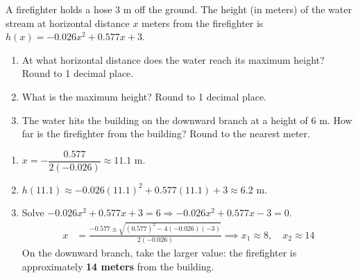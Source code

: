 \documentclass{ximera}
\begin{document}
\begin{problem}
A firefighter holds a hose 3 m off the ground. The height (in meters) of the water stream at horizontal distance $x$ meters from the firefighter is $h(x) = -0.026x^2 + 0.577x + 3$.
\begin{enumerate}
  \item[(a)] At what horizontal distance does the water reach its maximum height? Round to 1 decimal place.
  \medskip
  \item[(b)] What is the maximum height? Round to 1 decimal place.
  \medskip
  \item[(c)] The water hits the building on the downward branch at a height of 6 m. How far is the firefighter from the building? Round to the nearest meter.
\end{enumerate}

\begin{solution}
\begin{enumerate}
  \item[(a)] $x = -\dfrac{0.577}{2(-0.026)} \approx 11.1$ m.

  \item[(b)] $h(11.1) \approx -0.026(11.1)^2+0.577(11.1)+3 \approx 6.2$ m.

  \item[(c)] Solve $-0.026x^2+0.577x+3=6 \Rightarrow -0.026x^2+0.577x-3=0$.
  \begin{align*}
    x &= \frac{-0.577\pm\sqrt{(0.577)^2-4(-0.026)(-3)}}{2(-0.026)} \implies x_1 \approx 8,\quad x_2 \approx 14
  \end{align*}
  On the downward branch, take the larger value: the firefighter is approximately \textbf{14 meters} from the building.
\end{enumerate}
\end{solution}
\end{problem}
\end{document}
